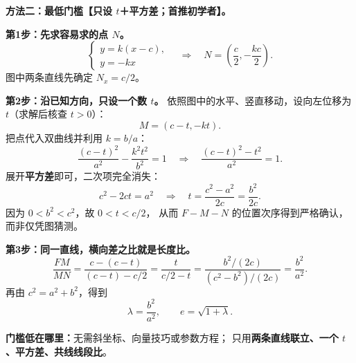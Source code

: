 \clearpage
\begin{proofbox}
\textbf{方法二：最低门槛【只设 $t$＋平方差；首推初学者】。}

\begin{center}\end{center}

\textbf{第1步：先求容易求的点 $N$。}
\[
\begin{cases}
y=k(x-c),\\
y=-kx
\end{cases}
\quad\Longrightarrow\quad
\boxed{N=\left(\frac c2,-\frac{kc}{2}\right)}.
\]
图中两条直线先确定 $N_x=c/2$。

\textbf{第2步：沿已知方向，只设一个数 $t$。}
依照图中的水平、竖直移动，设向左位移为 $t$（求解后核查 $t>0$）：
\[
\boxed{M=(c-t,-kt)}.
\]
把点代入双曲线并利用 $k=b/a$：
\[
\frac{(c-t)^2}{a^2}-\frac{k^2t^2}{b^2}=1
\quad\Longrightarrow\quad
\frac{(c-t)^2-t^2}{a^2}=1.
\]
展开\textbf{平方差}即可，二次项完全消失：
\[
c^2-2ct=a^2
\quad\Longrightarrow\quad
\boxed{t=\frac{c^2-a^2}{2c}=\frac{b^2}{2c}}.
\]
因为 $0<b^2<c^2$，故 $0<t<c/2$，
从而 $F-M-N$ 的位置次序得到严格确认，而非仅凭图猜测。

\textbf{第3步：同一直线，横向差之比就是长度比。}
\[
\frac{FM}{MN}
=\frac{c-(c-t)}{(c-t)-c/2}
=\frac{t}{c/2-t}
=\frac{b^2/(2c)}{(c^2-b^2)/(2c)}
=\boxed{\frac{b^2}{a^2}}.
\]
再由 $c^2=a^2+b^2$，得到
\[
\lambda=\frac{b^2}{a^2},\qquad
\boxed{e=\sqrt{1+\lambda}}.
\]

\textbf{门槛低在哪里：}无需斜坐标、向量技巧或参数方程；
只用\textbf{两条直线联立、一个 $t$、平方差、共线线段比}。
\end{proofbox}

